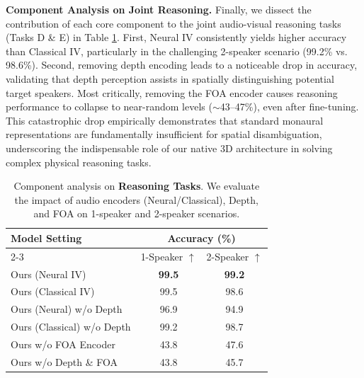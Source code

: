 \textbf{Component Analysis on Joint Reasoning.}
Finally, we dissect the contribution of each core component to the joint audio-visual reasoning tasks (Tasks D \& E) in Table \ref{tab:ablation_reasoning}.
First, Neural IV consistently yields higher accuracy than Classical IV, particularly in the challenging 2-speaker scenario (99.2\% vs. 98.6\%).
Second, removing depth encoding leads to a noticeable drop in accuracy, validating that depth perception assists in spatially distinguishing potential target speakers.
Most critically, removing the FOA encoder causes reasoning performance to collapse to near-random levels ($\sim$43--47\%), even after fine-tuning. This catastrophic drop empirically demonstrates that standard monaural representations are fundamentally insufficient for spatial disambiguation, underscoring the indispensable role of our native 3D architecture in solving complex physical reasoning tasks.

\begin{table}[t]
    \centering
    \setlength{\tabcolsep}{3pt}
    \caption{Component analysis on \textbf{Reasoning Tasks}. We evaluate the impact of audio encoders (Neural/Classical), Depth, and FOA on 1-speaker and 2-speaker scenarios.}
    \vspace{0.1in}
    
    \begin{tabular}{l cc}
    \toprule
    \multirow{2}{*}{\textbf{Model Setting}} & \multicolumn{2}{c}{\textbf{Accuracy (\%)}} \\
    \cmidrule(lr){2-3}
    & 1-Speaker $\uparrow$ & 2-Speaker $\uparrow$ \\
    \midrule
    
    Ours (Neural IV)             & \textbf{99.5} & \textbf{99.2} \\
    Ours (Classical IV)          & 99.5 & 98.6 \\
    \midrule
    
    Ours (Neural) w/o Depth      & 96.9 & 94.9 \\
    Ours (Classical) w/o Depth   & 99.2 & 98.7 \\
    \midrule
    
    Ours w/o FOA Encoder         & 43.8 & 47.6 \\
    Ours w/o Depth \& FOA        & 43.8 & 45.7 \\
    
    \bottomrule
    \end{tabular}
    \label{tab:ablation_reasoning}
\end{table}
